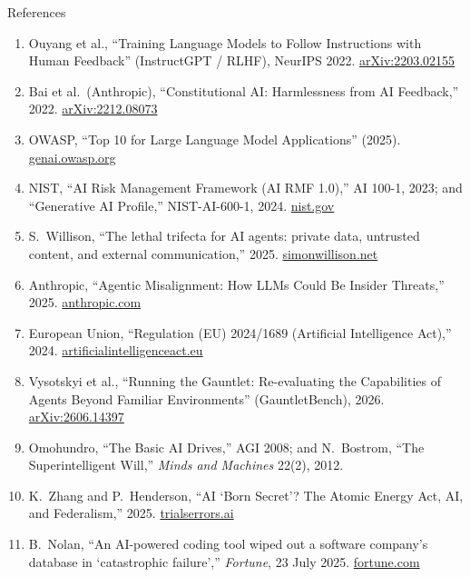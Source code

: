 \begin{frame}[allowframebreaks]{References}
\begin{enumerate}
    \item Ouyang et al., ``Training Language Models to Follow Instructions with Human Feedback'' (InstructGPT / RLHF), NeurIPS 2022. \href{https://arxiv.org/abs/2203.02155}{arXiv:2203.02155}
    \item Bai et al.\ (Anthropic), ``Constitutional AI: Harmlessness from AI Feedback,'' 2022. \href{https://arxiv.org/abs/2212.08073}{arXiv:2212.08073}
    \item OWASP, ``Top 10 for Large Language Model Applications'' (2025). \href{https://genai.owasp.org/}{genai.owasp.org}
    \item NIST, ``AI Risk Management Framework (AI RMF 1.0),'' AI 100-1, 2023; and ``Generative AI Profile,'' NIST-AI-600-1, 2024. \href{https://www.nist.gov/itl/ai-risk-management-framework}{nist.gov}
    \item S.\ Willison, ``The lethal trifecta for AI agents: private data, untrusted content, and external communication,'' 2025. \href{https://simonwillison.net/2025/Jun/16/the-lethal-trifecta/}{simonwillison.net}
    \item Anthropic, ``Agentic Misalignment: How LLMs Could Be Insider Threats,'' 2025. \href{https://www.anthropic.com/research/agentic-misalignment}{anthropic.com}
    \item European Union, ``Regulation (EU) 2024/1689 (Artificial Intelligence Act),'' 2024. \href{https://artificialintelligenceact.eu/}{artificialintelligenceact.eu}
    \item Vysotskyi et al., ``Running the Gauntlet: Re-evaluating the Capabilities of Agents Beyond Familiar Environments'' (GauntletBench), 2026. \href{https://arxiv.org/abs/2606.14397}{arXiv:2606.14397}
    \item Omohundro, ``The Basic AI Drives,'' AGI 2008; and N.\ Bostrom, ``The Superintelligent Will,'' \emph{Minds and Machines} 22(2), 2012.
    \item K.\ Zhang and P.\ Henderson, ``AI `Born Secret'? The Atomic Energy Act, AI, and Federalism,'' 2025. \href{https://www.trialserrors.ai/p/ai-born-secret-the-atomic-energy}{trialserrors.ai}
    \item B.\ Nolan, ``An AI-powered coding tool wiped out a software company's database in `catastrophic failure','' \emph{Fortune}, 23 July 2025. \href{https://fortune.com/2025/07/23/ai-coding-tool-replit-wiped-database-called-it-a-catastrophic-failure/}{fortune.com}
  \end{enumerate}
\end{frame}
